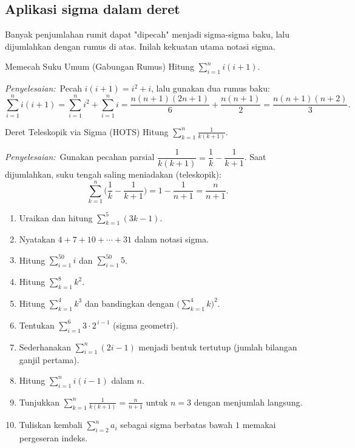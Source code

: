 \documentclass[11pt,a4paper]{report}
\theoremstyle{gaya}
\newcommand{\jawab}{\par\smallskip\noindent\textit{\textcolor{oranye}{Penyelesaian:}}\ }
\begin{document}
\subsection*{Aplikasi sigma dalam deret}
Banyak penjumlahan rumit dapat "dipecah" menjadi sigma-sigma baku, lalu dijumlahkan dengan rumus di atas. Inilah kekuatan utama notasi sigma.

\begin{contoh}{Memecah Suku Umum (Gabungan Rumus)}
Hitung $\displaystyle\sum_{i=1}^{n} i(i+1)$.

\jawab Pecah $i(i+1)=i^2+i$, lalu gunakan dua rumus baku:
\[
\sum_{i=1}^{n} i(i+1)=\sum_{i=1}^{n} i^2+\sum_{i=1}^{n} i
=\frac{n(n+1)(2n+1)}{6}+\frac{n(n+1)}{2}=\frac{n(n+1)(n+2)}{3}.
\]
\end{contoh}

\begin{contoh}{Deret Teleskopik via Sigma (HOTS)}
Hitung $\displaystyle\sum_{k=1}^{n}\frac{1}{k(k+1)}$.

\jawab Gunakan pecahan parsial $\dfrac{1}{k(k+1)}=\dfrac1k-\dfrac{1}{k+1}$. Saat dijumlahkan, suku tengah saling meniadakan (teleskopik):
\[
\sum_{k=1}^{n}\Big(\frac1k-\frac{1}{k+1}\Big)=1-\frac{1}{n+1}=\frac{n}{n+1}.
\]
\end{contoh}

\begin{latihan}
\begin{enumerate}[leftmargin=*]
  \item Uraikan dan hitung $\displaystyle\sum_{k=1}^{5}(3k-1)$.
  \item Nyatakan $4+7+10+\cdots+31$ dalam notasi sigma.
  \item Hitung $\displaystyle\sum_{i=1}^{50} i$ dan $\displaystyle\sum_{i=1}^{50}5$.
  \item Hitung $\displaystyle\sum_{k=1}^{8}k^2$.
  \item Hitung $\displaystyle\sum_{k=1}^{4}k^3$ dan bandingkan dengan $\big(\sum_{k=1}^{4}k\big)^2$.
  \item Tentukan $\displaystyle\sum_{i=1}^{6}3\cdot2^{\,i-1}$ (sigma geometri).
  \item Sederhanakan $\displaystyle\sum_{i=1}^{n}(2i-1)$ menjadi bentuk tertutup (jumlah bilangan ganjil pertama).
  \item Hitung $\displaystyle\sum_{i=1}^{n} i(i-1)$ dalam $n$.
  \item Tunjukkan $\displaystyle\sum_{k=1}^{n}\frac{1}{k(k+1)}=\frac{n}{n+1}$ untuk $n=3$ dengan menjumlah langsung.
  \item Tuliskan kembali $\displaystyle\sum_{i=2}^{n}a_i$ sebagai sigma berbatas bawah $1$ memakai pergeseran indeks.
\end{enumerate}
\end{latihan}
\end{document}
